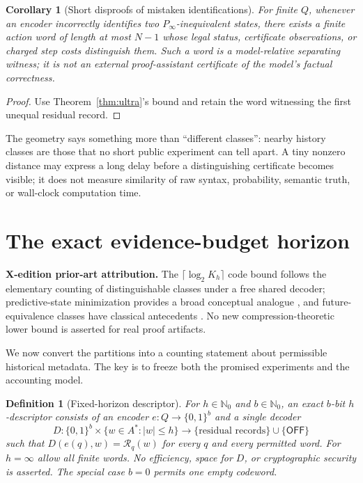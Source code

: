 \documentclass[11pt,letterpaper]{article}
\newcommand{\PriorArtNote}[1]{%
\par\smallskip\noindent\begin{minipage}{\linewidth}\small\color{black!85}%
\textbf{X-edition prior-art attribution.} #1\end{minipage}\par\smallskip}
\newtheorem{corollary}[theorem]{Corollary}
\newtheorem{definition}[theorem]{Definition}
\newcommand{\Nzero}{\mathbb{N}_0}
\newcommand{\off}{\mathsf{OFF}}
\newcommand{\R}{\mathcal{R}}
\newcommand{\B}{\{0,1\}}
\begin{document}
\begin{corollary}[Short disproofs of mistaken identifications]\label{cor:witness}
For finite $Q$, whenever an encoder incorrectly identifies two $P_\infty$-inequivalent states, there exists a finite action word of length at most $N-1$ whose legal status, certificate observations, or charged step costs distinguish them. Such a word is a \emph{model-relative separating witness}; it is not an external proof-assistant certificate of the model's factual correctness.
\end{corollary}
\begin{proof}
Use Theorem~\ref{thm:ultra}'s bound and retain the word witnessing the first unequal residual record.
\end{proof}

The geometry says something more than ``different classes'': nearby history classes are those that no short public experiment can tell apart. A tiny nonzero distance may express a long delay before a distinguishing certificate becomes visible; it does not measure similarity of raw syntax, probability, semantic truth, or wall-clock computation time.

\section{The exact evidence-budget horizon}
\PriorArtNote{The $\lceil\log_2 K_h\rceil$ code bound follows the elementary counting of distinguishable classes under a free shared decoder; predictive-state minimization provides a broad conceptual analogue \cite{shalizi}, and future-equivalence classes have classical antecedents \cite{nerode}. No new compression-theoretic lower bound is asserted for real proof artifacts.}
We now convert the partitions into a counting statement about permissible historical metadata. The key is to freeze both the promised experiments and the accounting model.

\begin{definition}[Fixed-horizon descriptor]\label{def:descriptor}
For $h\in\Nzero$ and $b\in\Nzero$, an \emph{exact $b$-bit $h$-descriptor} consists of an encoder $e:Q\to\B^b$ and a single decoder
\[
 D:\B^b\times\{w\in A^*:|w|\le h\}\longrightarrow \{\text{residual records}\}\cup\{\off\}
\]
such that $D(e(q),w)=\R_q(w)$ for every $q$ and every permitted word. For $h=\infty$ allow all finite words. No efficiency, space for $D$, or cryptographic security is asserted. The special case $b=0$ permits one empty codeword.
\end{definition}
\end{document}

